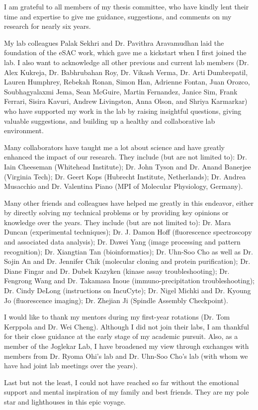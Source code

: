 I am grateful to all members of my thesis committee, who have kindly lent their time and expertise to give me guidance, suggestions, and comments on my research for nearly six years.

My lab colleagues Palak Sekhri and Dr. Pavithra Aravamudhan laid the foundation of the eSAC work, which gave me a kickstart when I first joined the lab. I also want to acknowledge all other previous and current lab members (Dr. Alex Kukreja, Dr. Babhrubahan Roy, Dr. Vikash Verma, Dr. Arti Dumbrepatil, Lauren Humphrey, Rebekah Ronan, Simon Han,  Adrienne Fontan, Juan Orozco, Soubhagyalaxmi Jema, Sean McGuire, Martin Fernandez, Janice Sim, Frank Ferrari, Sisira Kavuri, Andrew Livingston, Anna Olson, and Shriya Karmarkar) who have supported my work in the lab by raising insightful questions, giving valuable suggestions, and building up a healthy and collaborative lab environment.

Many collaborators have taught me a lot about science and have greatly enhanced the impact of our research. They include (but are not limited to): Dr. Iain Cheeseman (Whitehead Institute); Dr. John Tyson and Dr. Anand Banerjee (Virginia Tech); Dr. Geert Kops (Hubrecht Institute, Netherlands); Dr. Andrea Musacchio and Dr. Valentina Piano (MPI of Molecular Physiology, Germany).

Many other friends and colleagues have helped me greatly in this endeavor, either by directly solving my technical problems or by providing key opinions or knowledge over the years. They include (but are not limited to): Dr. Mara Duncan (experimental techniques); Dr. J. Damon Hoff (fluorescence spectroscopy and associated data analysis); Dr. Dawei Yang (image processing and pattern recognition); Dr. Xiangtian Tan (bioinformatics); Dr. Uhn-Soo Cho as well as Dr. Sojin An and Dr. Jennifer Chik (molecular cloning and protein purification); Dr. Diane Fingar and Dr. Dubek Kazyken (kinase assay troubleshooting); Dr. Fengrong Wang and Dr. Takamasa Inoue (immuno-precipitation troubleshooting); Dr. Cindy DeLong (instructions on IncuCyte); Dr. Nigel Michki and Dr. Kyoung Jo (fluorescence imaging); Dr. Zhejian Ji (Spindle Assembly Checkpoint).

I would like to thank my mentors during my first-year rotations (Dr. Tom Kerppola and Dr. Wei Cheng). Although I did not join their labs, I am thankful for their close guidance at the early stage of my academic pursuit. Also, as a member of the Joglekar Lab, I have broadened my view through exchanges with members from Dr. Ryoma Ohi's lab and Dr. Uhn-Soo Cho's lab (with whom we have had joint lab meetings over the years).

Last but not the least, I could not have reached so far without the emotional support and mental inspiration of my family and best friends. They are my pole star and lighthouses in this epic voyage.